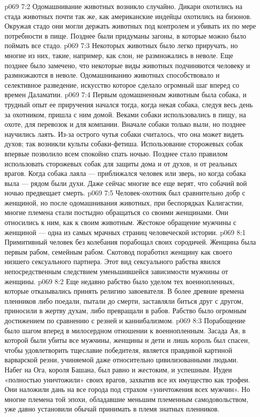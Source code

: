 \vs p069 7:2 Одомашнивание животных возникло случайно. Дикари охотились на стада животных почти так же, как американские индейцы охотились на бизонов. Окружая стадо они могли держать животных под контролем и убивать их по мере потребности в пище. Позднее были придуманы загоны, в которые можно было поймать все стадо.
\vs p069 7:3 Некоторых животных было легко приручать, но многие из них, такие, например, как слон, не размножались в неволе. Еще позднее было замечено, что некоторые виды животных подчиняются человеку и размножаются в неволе. Одомашниванию животных способствовало и селективное разведение, искусство которое сделало огромный шаг вперед со времен Даламатии.
\vs p069 7:4 Первым одомашненным животным была собака, и трудный опыт ее приручения начался тогда, когда некая собака, следуя весь день за охотником, пришла с ним домой. Веками собаки использовались в пищу, на охоте, для перевозок и для компании. Вначале собаки только выли, но позднее научились лаять. Из\hyp{}за острого чутья собаки считалось, что она может видеть духов; так возникли культы собаки\hyp{}фетиша. Использование сторожевых собак впервые позволило всем спокойно спать ночью. Позднее стало правилом использовать сторожевых собак для защиты дома и от духов, и от реальных врагов. Когда собака лаяла --- приближался человек или зверь, но когда собака выла --- рядом были духи. Даже сейчас многие все еще верят, что собачий вой ночью предвещает смерть.
\vs p069 7:5 Человек\hyp{}охотник был сравнительно добр с женщиной, но после одомашнивания животных, при беспорядках Калигастии, многие племена стали постыдно обращаться со своими женщинами. Они относились к ним, как к своим животным. Жестокое обращение мужчины с женщиной --- одна из самых мрачных страниц человеческой истории.
\vs p069 8:1 Примитивный человек без колебания порабощал своих сородичей. Женщина была первым рабом, семейным рабом. Скотовод поработил женщину как своего низшего сексуального партнера. Этот вид сексуального рабства явился непосредственным следствием уменьшившейся зависимости мужчины от женщины.
\vs p069 8:2 Еще недавно рабство было уделом тех военнопленных, которые отказывались принять религию завоевателя. В более древние времена пленников либо поедали, пытали до смерти, заставляли биться друг с другом, приносили в жертву духам, либо превращали в рабов. Рабство было огромным достижением по сравнению с резней и каннибализмом.
\vs p069 8:3 Порабощение было шагом вперед в милосердном отношении к военнопленным. Засада Ая, в которой были убиты все мужчины, женщины и дети и лишь король был спасен, чтобы удовлетворить тщеславие победителя, является правдивой картиной варварской резни, учиняемой даже относительно цивилизованными людьми. Набег на Ога, короля Башана, был равно и жестоким, и успешным. Иудеи «полностью уничтожили» своих врагов, захватив все их имущество как трофеи. Они наложили дань на все города под страхом «уничтожения всех мужчин». Но многие племена той эпохи, обладавшие меньшим племенным самодовольством, уже давно установили обычай принимать в племя знатных пленников.
